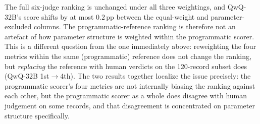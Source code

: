 \begin{table}[h!]
\centering
\small
\setlength{\tabcolsep}{4pt}
\renewcommand{\arraystretch}{1.1}
\caption{With-GT judge ranking (programmatic reference) under alternative weightings of the parameter-structure metric. The full six-judge ranking is identical across all three weightings.}
\label{tab:param-robustness}
\end{table}

The full six-judge ranking is unchanged under all three weightings, and QwQ-32B's score shifts by at most $0.2$\,pp between the equal-weight and parameter-excluded columns. The programmatic-reference ranking is therefore not an artefact of how parameter structure is weighted within the programmatic scorer. This is a different question from the one immediately above: reweighting the four metrics within the same (programmatic) reference does not change the ranking, but \emph{replacing} the reference with human verdicts on the 120-record subset does (QwQ-32B 1st$\to$4th). The two results together localize the issue precisely: the programmatic scorer's four metrics are not internally biasing the ranking against each other, but the programmatic scorer as a whole does disagree with human judgement on some records, and that disagreement is concentrated on parameter structure specifically.


